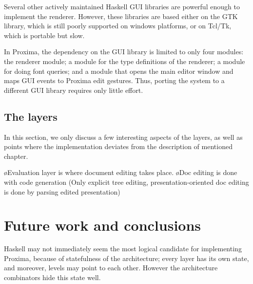 Several other actively maintained Haskell GUI libraries are powerful enough to implement the renderer. However, these libraries are based either on the GTK library, which is still poorly supported on windows platforms, or on Tcl/Tk, which is portable but slow.

In Proxima, the dependency on the GUI library is limited to only four modules: the renderer module; a module for the type definitions of the renderer; a module for doing font queries; and a module that opens the main editor window and maps GUI events to Proxima edit gestures. Thus, porting the system to a different GUI library requires only little effort. 



\bc
\subsection{The layers}
\toHere

In this section, we only discuss a few interesting aspects of the layers, as well as points where the implementation deviates from the description of mentioned chapter.

\bl
\o Evaluation layer is where document editing takes place. 
\o Doc editing is done with code generation (Only explicit tree editing, presentation-oriented doc editing is done by parsing edited presentation)
\el
\ec


\section{Future work and conclusions} \label{sect:protoConcl}

\bc
\fromHere
Haskell may not immediately seem the most logical candidate for implementing Proxima, because of statefulness of the architecture; every layer has its own state, and moreover, levels may point to each other. However the architecture combinators hide this state well. 
\toHere

